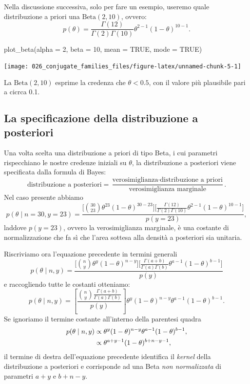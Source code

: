 \documentclass[
  10pt,
  italian,
  a4paper,
  extrafontsizes,onecolumn,openright
  ]{memoir}
\newenvironment{Shaded}{\begin{snugshade}}{\end{snugshade}}
\newcommand{\AttributeTok}[1]{\textcolor[rgb]{0.77,0.63,0.00}{#1}}
\newcommand{\ConstantTok}[1]{\textcolor[rgb]{0.00,0.00,0.00}{#1}}
\newcommand{\DecValTok}[1]{\textcolor[rgb]{0.00,0.00,0.81}{#1}}
\newcommand{\FunctionTok}[1]{\textcolor[rgb]{0.00,0.00,0.00}{#1}}
\newcommand{\NormalTok}[1]{#1}
\theoremstyle{definition}
\theoremstyle{definition}
\theoremstyle{definition}
\theoremstyle{definition}
\theoremstyle{remark}
\begin{document}
Nella discussione successiva, solo per fare un esempio, useremo quale distribuzione a priori una \(\mbox{Beta}(2, 10)\), ovvero:
\[
p(\theta) = \frac{\Gamma(12)}{\Gamma(2)\Gamma(10)}\theta^{2-1} (1-\theta)^{10-1}.
\]

\begin{Shaded}
\begin{Highlighting}[]
\FunctionTok{plot\_beta}\NormalTok{(}\AttributeTok{alpha =} \DecValTok{2}\NormalTok{, }\AttributeTok{beta =} \DecValTok{10}\NormalTok{, }\AttributeTok{mean =} \ConstantTok{TRUE}\NormalTok{, }\AttributeTok{mode =} \ConstantTok{TRUE}\NormalTok{)}
\end{Highlighting}
\end{Shaded}

\begin{center}\texttt{[image: 026\_conjugate\_families\_files/figure-latex/unnamed-chunk-5-1]} \end{center}

\noindent
La \(\mbox{Beta}(2, 10)\) esprime la credenza che \(\theta < 0.5\), con il valore più plausibile pari a cicrca 0.1.

\hypertarget{la-specificazione-della-distribuzione-a-posteriori}{%
\subsection{La specificazione della distribuzione a posteriori}\label{la-specificazione-della-distribuzione-a-posteriori}}

Una volta scelta una distribuzione a priori di tipo Beta, i cui parametri rispecchiano le nostre credenze iniziali su \(\theta\), la distribuzione a posteriori viene specificata dalla formula di Bayes:
\[
\text{distribuzione a posteriori} = \frac{\text{verosimiglianza}\cdot\text{distribuzione a priori}}{\text{verosimiglianza marginale}}.
\]
Nel caso presente abbiamo
\[
p(\theta \mid n=30, y=23) = \frac{\Big[\binom{30}{23}\theta^{23}(1-\theta)^{30-23}\Big]\Big[\frac{\Gamma(12)}{\Gamma(2)\Gamma(10)}\theta^{2-1} (1-\theta)^{10-1}\Big]}{p(y = 23)},
\]
laddove \(p(y = 23)\), ovvero la verosimiglianza marginale, è una costante di normalizzazione che fa sì che l'area sottesa alla densità a posteriori sia unitaria.

Riscriviamo ora l'equazione precedente in termini generali
\[
p(\theta \mid n, y) = \frac{\Big[\binom{n}{y}\theta^{y}(1-\theta)^{n-y}\Big]\Big[\frac{\Gamma(a+b)}{\Gamma(a)\Gamma(b)}\theta^{a-1} (1-\theta)^{b-1}\Big]}{p(y)}
\]
\noindent
e raccogliendo tutte le costanti otteniamo:
\[
p(\theta \mid n, y) =\left[\frac{\binom{n}{y}\frac{\Gamma(a+b)}{\Gamma(a)\Gamma(b)}}{p(y)}\right] \theta^{y}(1-\theta)^{n-y}\theta^{a-1} (1-\theta)^{b-1}.
\]
\noindent
Se ignoriamo il termine costante all'interno della parentesi quadra
\begin{align}
p(\theta \mid n, y) &\propto \theta^{y}(1-\theta)^{n-y}\theta^{a-1} (1-\theta)^{b-1},\notag\\
&\propto \theta^{a+y-1}(1-\theta)^{b+n-y-1},\notag
\end{align}
\noindent
il termine di destra dell'equazione precedente identifica il \emph{kernel} della distribuzione a posteriori e corrisponde ad una Beta \emph{non normalizzata} di parametri \(a + y\) e \(b + n - y\).
\end{document}
